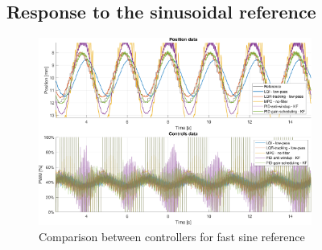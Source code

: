 \subsection{Response to the sinusoidal reference}
\label{subsec:plot_sinusoidal}

\begin{figure}[H]
    \centering
    \includegraphics[width=0.8\textwidth]{./img/MATLAB/results/sinusoidal_fast_star_star.pdf}
    \caption{Comparison between controllers for fast sine reference}
    \label{fig:fast_sine}
\end{figure}